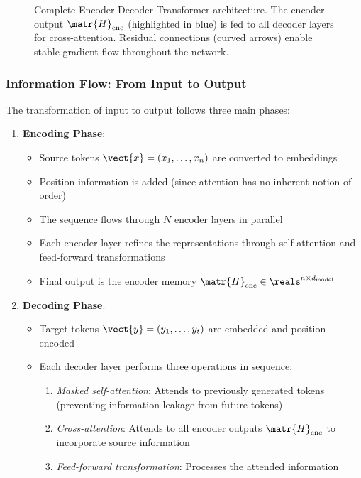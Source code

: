 \begin{figure}[h!]
\begin{tikzpicture}[scale=1.2, transform shape]
  \end{tikzpicture}
  \caption{Complete Encoder-Decoder Transformer architecture. The encoder output $\matr{H}_{\text{enc}}$ (highlighted in blue) is fed to all decoder layers for cross-attention. Residual connections (curved arrows) enable stable gradient flow throughout the network.}
  \label{fig:transformer}
\end{figure}

\subsubsection{Information Flow: From Input to Output}

The transformation of input to output follows three main phases:

\begin{enumerate}[leftmargin=*]
  \item \textbf{Encoding Phase}:
    \begin{itemize}
      \item Source tokens $\vect{x} = (x_1, \ldots, x_n)$ are converted to embeddings
      \item Position information is added (since attention has no inherent notion of order)
      \item The sequence flows through $N$ encoder layers in parallel
      \item Each encoder layer refines the representations through self-attention and feed-forward transformations
      \item Final output is the encoder memory $\matr{H}_{\text{enc}} \in \reals^{n \times d_{\text{model}}}$
    \end{itemize}

  \item \textbf{Decoding Phase}:
    \begin{itemize}
      \item Target tokens $\vect{y} = (y_1, \ldots, y_t)$ are embedded and position-encoded
      \item Each decoder layer performs three operations in sequence:
        \begin{enumerate}
          \item \textit{Masked self-attention}: Attends to previously generated tokens (preventing information leakage from future tokens)
          \item \textit{Cross-attention}: Attends to all encoder outputs $\matr{H}_{\text{enc}}$ to incorporate source information
          \item \textit{Feed-forward transformation}: Processes the attended information
        \end{enumerate}
    \end{itemize}


\end{enumerate}
